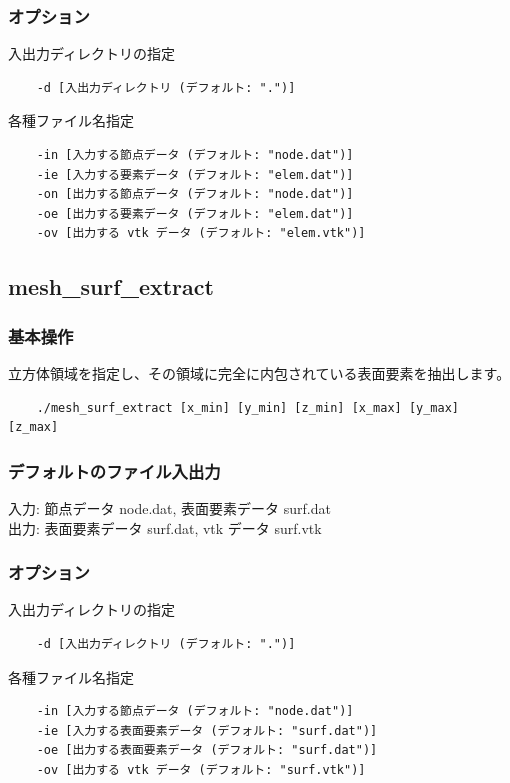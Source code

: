\documentclass[8pt,a4paper]{article}
\begin{document}
\subsubsection*{オプション}
入出力ディレクトリの指定
\begin{verbatim}
    -d [入出力ディレクトリ (デフォルト: ".")]
\end{verbatim}
各種ファイル名指定
\begin{verbatim}
    -in [入力する節点データ (デフォルト: "node.dat")]
    -ie [入力する要素データ (デフォルト: "elem.dat")]
    -on [出力する節点データ (デフォルト: "node.dat")]
    -oe [出力する要素データ (デフォルト: "elem.dat")]
    -ov [出力する vtk データ (デフォルト: "elem.vtk")]
\end{verbatim}

\subsection{mesh\_surf\_extract}
\subsubsection*{基本操作}
立方体領域を指定し、その領域に完全に内包されている表面要素を抽出します。
\begin{verbatim}
    ./mesh_surf_extract [x_min] [y_min] [z_min] [x_max] [y_max] [z_max]
\end{verbatim}

\subsubsection*{デフォルトのファイル入出力}
入力: 節点データ node.dat, 表面要素データ surf.dat \\ \noindent
出力: 表面要素データ surf.dat, vtk データ surf.vtk

\subsubsection*{オプション}
入出力ディレクトリの指定
\begin{verbatim}
    -d [入出力ディレクトリ (デフォルト: ".")]
\end{verbatim}
各種ファイル名指定
\begin{verbatim}
    -in [入力する節点データ (デフォルト: "node.dat")]
    -ie [入力する表面要素データ (デフォルト: "surf.dat")]
    -oe [出力する表面要素データ (デフォルト: "surf.dat")]
    -ov [出力する vtk データ (デフォルト: "surf.vtk")]
\end{verbatim}
\end{document}

